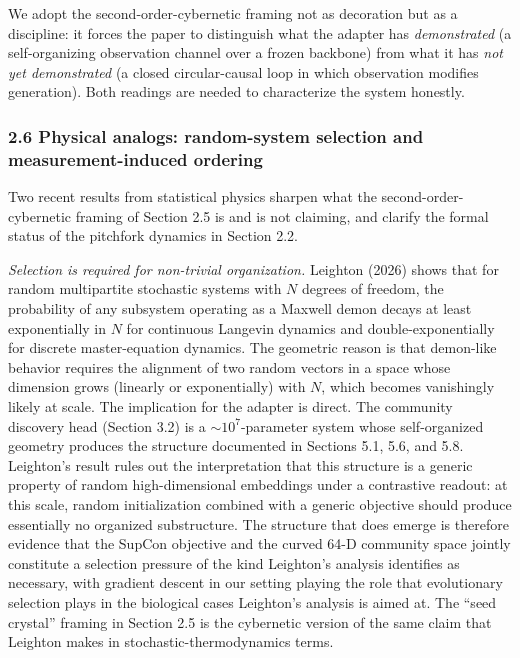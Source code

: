 \documentclass[
  11pt]{article}
\begin{document}
We adopt the second-order-cybernetic framing not as decoration but as a
discipline: it forces the paper to distinguish what the adapter has
\emph{demonstrated} (a self-organizing observation channel over a frozen
backbone) from what it has \emph{not yet demonstrated} (a closed
circular-causal loop in which observation modifies generation). Both
readings are needed to characterize the system honestly.

\subsubsection{2.6 Physical analogs: random-system selection and
measurement-induced
ordering}\label{physical-analogs-random-system-selection-and-measurement-induced-ordering}

Two recent results from statistical physics sharpen what the
second-order-cybernetic framing of Section 2.5 is and is not claiming,
and clarify the formal status of the pitchfork dynamics in Section 2.2.

\emph{Selection is required for non-trivial organization.} Leighton
(2026) shows that for random multipartite stochastic systems with \(N\)
degrees of freedom, the probability of any subsystem operating as a
Maxwell demon decays at least exponentially in \(N\) for continuous
Langevin dynamics and double-exponentially for discrete master-equation
dynamics. The geometric reason is that demon-like behavior requires the
alignment of two random vectors in a space whose dimension grows
(linearly or exponentially) with \(N\), which becomes vanishingly likely
at scale. The implication for the adapter is direct. The community
discovery head (Section 3.2) is a \(\sim 10^7\)-parameter system whose
self-organized geometry produces the structure documented in Sections
5.1, 5.6, and 5.8. Leighton's result rules out the interpretation that
this structure is a generic property of random high-dimensional
embeddings under a contrastive readout: at this scale, random
initialization combined with a generic objective should produce
essentially no organized substructure. The structure that does emerge is
therefore evidence that the SupCon objective and the curved 64-D
community space jointly constitute a selection pressure of the kind
Leighton's analysis identifies as necessary, with gradient descent in
our setting playing the role that evolutionary selection plays in the
biological cases Leighton's analysis is aimed at. The ``seed crystal''
framing in Section 2.5 is the cybernetic version of the same claim that
Leighton makes in stochastic-thermodynamics terms.
\end{document}

